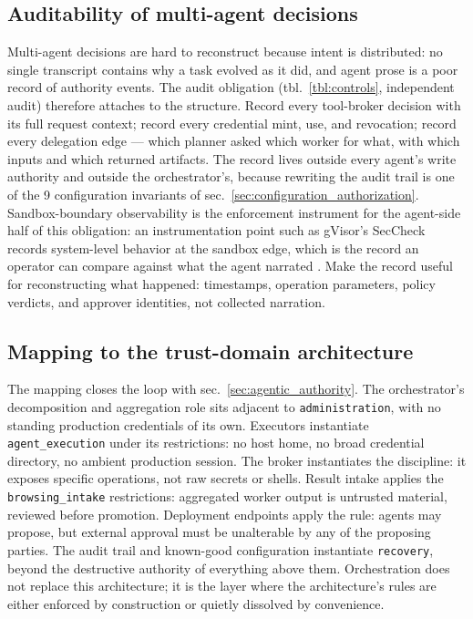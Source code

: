 \documentclass[
  english,
  9pt,
]{extarticle}
\begin{document}
\subsection{Auditability of multi-agent
decisions}\label{auditability-of-multi-agent-decisions}

Multi-agent decisions are hard to reconstruct because intent is
distributed: no single transcript contains why a task evolved as it did,
and agent prose is a poor record of authority events. The audit
obligation (tbl.~\ref{tbl:controls}, independent audit) therefore
attaches to the structure. Record every tool-broker decision with its
full request context; record every credential mint, use, and revocation;
record every delegation edge --- which planner asked which worker for
what, with which inputs and which returned artifacts. The record lives
outside every agent's write authority and outside the orchestrator's,
because rewriting the audit trail is one of the 9 configuration
invariants of sec.~\ref{sec:configuration_authorization}.
Sandbox-boundary observability is the enforcement instrument for the
agent-side half of this obligation: an instrumentation point such as
gVisor's SecCheck records system-level behavior at the sandbox edge,
which is the record an operator can compare against what the agent
narrated \citep{gvisor_seccheck}. Make the record useful for
reconstructing what happened: timestamps, operation parameters, policy
verdicts, and approver identities, not collected narration.

\subsection{Mapping to the trust-domain
architecture}\label{mapping-to-the-trust-domain-architecture}

The mapping closes the loop with sec.~\ref{sec:agentic_authority}. The
orchestrator's decomposition and aggregation role sits adjacent to
\texttt{administration}, with no standing production credentials of its
own. Executors instantiate \texttt{agent\_execution} under its
restrictions: no host home, no broad credential directory, no ambient
production session. The broker instantiates the
 discipline: it exposes specific operations,
not raw secrets or shells. Result intake applies the
\texttt{browsing\_intake} restrictions: aggregated worker output is
untrusted material, reviewed before promotion. Deployment endpoints
apply the  rule: agents may propose, but
external approval must be unalterable by any of the proposing parties.
The audit trail and known-good configuration instantiate
\texttt{recovery}, beyond the destructive authority of everything above
them. Orchestration does not replace this architecture; it is the layer
where the architecture's rules are either enforced by construction or
quietly dissolved by convenience.
\end{document}
